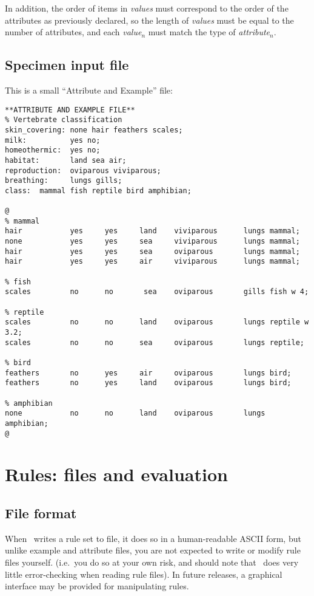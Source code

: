 In addition, the order of items in {\it values} must correspond to the
order of the attributes as previously declared, so the length
of {\it values} must be equal to the number of attributes, and 
each {\it value$_n$} must match the type of {\it attribute$_n$}.

\subsection{Specimen input file}
\label{example}
This is a small ``Attribute and Example'' file:

{\small
\begin{verbatim}
**ATTRIBUTE AND EXAMPLE FILE**
% Vertebrate classification
skin_covering: none hair feathers scales;
milk:          yes no;
homeothermic:  yes no;
habitat:       land sea air;
reproduction:  oviparous viviparous;
breathing:     lungs gills;
class:	mammal fish reptile bird amphibian;

@
% mammal
hair           yes     yes     land    viviparous      lungs mammal;
none           yes     yes     sea     viviparous      lungs mammal;
hair           yes     yes     sea     oviparous       lungs mammal;
hair           yes     yes     air     viviparous      lungs mammal;

% fish 
scales         no      no       sea    oviparous       gills fish w 4;

% reptile
scales         no      no      land    oviparous       lungs reptile w 3.2;
scales         no      no      sea     oviparous       lungs reptile;

% bird
feathers       no      yes     air     oviparous       lungs bird;
feathers       no      yes     land    oviparous       lungs bird;

% amphibian
none           no      no      land    oviparous       lungs amphibian;
@
\end{verbatim}}


\section{Rules: files and  evaluation}

\subsection{File format}
When \CN\ writes a rule set to file, it does so in a
human-readable ASCII form, but unlike example and attribute files,
you are not expected to write or modify rule files yourself.
(i.e.\ you do so at your own risk, and should note that
\CN\ does very little error-checking when reading rule files).
In future releases, a graphical interface may be provided
for manipulating rules.

